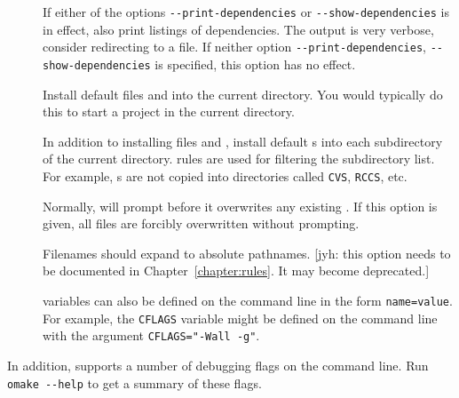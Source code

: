 \begin{description}
\item[] If either of the options \texttt{-{}-print-dependencies} or
\texttt{-{}-show-dependencies} is in effect, also print listings of dependencies.  The output is
very verbose, consider redirecting to a file.  If neither option \texttt{-{}-print-dependencies},
\texttt{-{}-show-dependencies} is specified, this option has no effect.

\item[] Install default files  and  into the current
  directory.  You would typically do this to start a project in the current directory.

\item[] In addition to installing files  and ,
  install default s into each subdirectory of the current directory.
   rules are used for filtering the subdirectory list.  For example, s
  are not copied into directories called \verb+CVS+, \verb+RCCS+, etc.

\item[] Normally,  will prompt before it overwrites any
  existing .  If this option is given, all files are forcibly overwritten
  without prompting.

\item[] Filenames should expand to absolute pathnames.  [jyh: this option needs to
be documented in Chapter~\ref{chapter:rules}.  It may become deprecated.]

\item[]  variables can also be defined on the command
  line in the form \verb+name=value+.  For example, the \verb+CFLAGS+ variable might be defined
  on the command line with the argument \verb+CFLAGS="-Wall -g"+.
\end{description}

In addition,  supports a number of debugging flags on the command line. Run
\verb+omake --help+ to get a summary of these flags.

